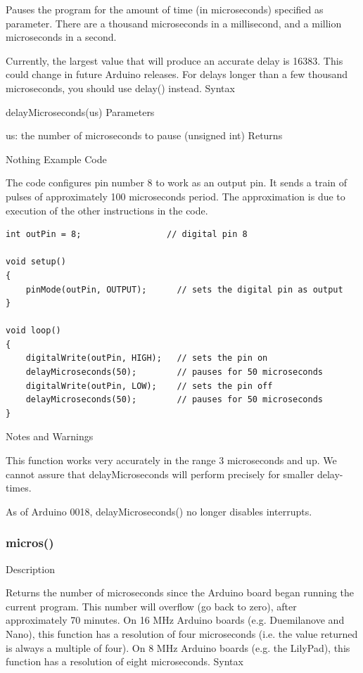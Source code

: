 \documentclass[12pt,a4paper]{report}  %
\begin{document}
Pauses the program for the amount of time (in microseconds) specified as parameter. There are a thousand microseconds in a millisecond, and a million microseconds in a second.

Currently, the largest value that will produce an accurate delay is 16383. This could change in future Arduino releases. For delays longer than a few thousand microseconds, you should use delay() instead.
Syntax

delayMicroseconds(us)
Parameters

us: the number of microseconds to pause (unsigned int)
Returns

Nothing
Example Code

The code configures pin number 8 to work as an output pin. It sends a train of pulses of approximately 100 microseconds period. The approximation is due to execution of the other instructions in the code.

\begin{lstlisting}[label=digitalwrite,caption=delayMicroseconds]
int outPin = 8;                 // digital pin 8

void setup()
{
	pinMode(outPin, OUTPUT);      // sets the digital pin as output
}

void loop()
{
	digitalWrite(outPin, HIGH);   // sets the pin on
	delayMicroseconds(50);        // pauses for 50 microseconds
	digitalWrite(outPin, LOW);    // sets the pin off
	delayMicroseconds(50);        // pauses for 50 microseconds
}
\end{lstlisting}

Notes and Warnings

This function works very accurately in the range 3 microseconds and up. We cannot assure that delayMicroseconds will perform precisely for smaller delay-times.

As of Arduino 0018, delayMicroseconds() no longer disables interrupts.

\subsubsection{micros()}\label{micros}


Description

Returns the number of microseconds since the Arduino board began running the current program. This number will overflow (go back to zero), after approximately 70 minutes. On 16 MHz Arduino boards (e.g. Duemilanove and Nano), this function has a resolution of four microseconds (i.e. the value returned is always a multiple of four). On 8 MHz Arduino boards (e.g. the LilyPad), this function has a resolution of eight microseconds.
Syntax
\end{document}
